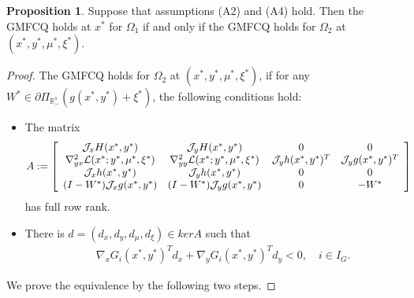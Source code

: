 \documentclass[11pt]{article}
\theoremstyle{definition}
\newtheorem{proposition}[theorem]{Proposition}
\theoremstyle{remark}
\numberwithin{equation}{section}
\begin{document}
\begin{proposition}\label{prop MFCQ of SP FP}
 Suppose that assumptions \textnormal{(A2)} and \textnormal{(A4)} hold. Then
the GMFCQ holds at $x^*$ for $\Omega_1$ if and only if  the GMFCQ holds for $\Omega_2$ at $(x^*,y^*,\mu^*,\xi^*)$.
	\end{proposition}
\begin{proof} The GMFCQ holds for $\Omega_2$ at $(x^*,y^*,\mu^*,\xi^*)$, if for any $ W^*\in
\partial\Pi_{\mathbb{R}_{-}^s}(g(x^*,y^*)+\xi^*)$, the following conditions hold:
\begin{itemize}
  \item[(a)] The matrix
  \begin{align}%
           &  A:=\left[\begin{array}{cccc}
                     \mathcal{J}_xH(x^*,y^*) & \mathcal{J}_yH(x^*,y^*) & 0 & 0 \\
                    \nabla_{yx}^2 \mathcal{L}(x^*;y^*,\mu^*,\xi^*)
                    &\nabla_{yy}^2 \mathcal{L}(x^*;y^*,\mu^*,\xi^*)
                    &\mathcal{J}_y h(x^*,y^*)^T &\mathcal{J}_y g(x^*,y^*)^T \\
                     \mathcal{J}_x h(x^*,y^*) & \mathcal{J}_y h(x^*,y^*)&0&0 \\
                     (I-W^*)\mathcal{J}_x g(x^*,y^*) & (I-W^*)\mathcal{J}_y g(x^*,y^*)&0& -W^*
                   \end{array}
  \right]\notag
  \end{align}
  has full row rank.
  \item[(b)]There is $d= (d_x,d_y,d_{\mu},d_{\xi})\in ker A $ such that
      \begin{eqnarray}
    &&  \nabla_xG_i(x^*,y^*)^Td_x+  \nabla_yG_i(x^*,y^*)^T d_y  <0,\quad i\in I_G. \label{mfg}
  \end{eqnarray}
\end{itemize}
We prove the equivalence by the following two steps.


\end{proof}
\end{document}
